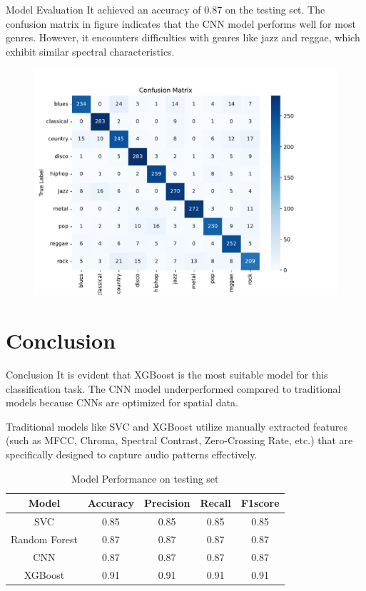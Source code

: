\documentclass{beamer}
\begin{document}
\begin{frame}{Model Evaluation}
  It achieved an accuracy of 0.87 on the testing set. The confusion matrix in figure indicates that the CNN model performs well for most genres. However, it encounters difficulties with genres like jazz and reggae, which exhibit similar spectral characteristics.
  \begin{figure}
    \centering
    \includegraphics[height=0.4\textwidth]{images/cnn_evaluation.pdf}
  \end{figure}
\end{frame}

\section{Conclusion}
\begin{frame}{Conclusion}
  It is evident that XGBoost is the most suitable model for this classification task. The CNN model underperformed compared to traditional models because CNNs are optimized for spatial data.

  Traditional models like SVC and XGBoost utilize manually extracted features (such as MFCC, Chroma, Spectral Contrast, Zero-Crossing Rate, etc.) that are specifically designed to capture audio patterns effectively.

  \begin{table}[h]
    \centering
    \begin{tabular}{ccccc}
      \toprule
      \textbf{Model} & \textbf{Accuracy} & \textbf{Precision} & \textbf{Recall} & \textbf{F1\-score} \\
      \midrule
      SVC            & 0.85              & 0.85               & 0.85            & 0.85               \\
      Random Forest  & 0.87              & 0.87               & 0.87            & 0.87               \\
      CNN            & 0.87              & 0.87               & 0.87            & 0.87               \\
      XGBoost        & 0.91              & 0.91               & 0.91            & 0.91               \\
      \bottomrule
    \end{tabular}
    \caption{Model Performance on testing set}
    \label{tab:performance}
  \end{table}
\end{frame}
\end{document}
